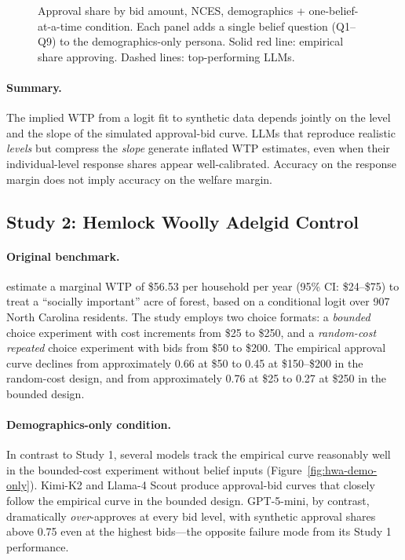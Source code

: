 \documentclass[12pt]{article}
\begin{document}
\begin{figure}[h]
    \centering
    \caption{Approval share by bid amount, NCES, demographics + one-belief-at-a-time condition. Each panel adds a single belief question (Q1--Q9) to the demographics-only persona. Solid red line: empirical share approving. Dashed lines: top-performing LLMs.}
    \label{fig:nces-one-belief}
\end{figure}

\paragraph{Summary.} The implied WTP from a logit fit to synthetic data depends jointly on the level and the slope of the simulated approval-bid curve. LLMs that reproduce realistic \emph{levels} but compress the \emph{slope} generate inflated WTP estimates, even when their individual-level response shares appear well-calibrated. Accuracy on the response margin does not imply accuracy on the welfare margin.

\subsection{Study 2: Hemlock Woolly Adelgid Control}\label{sec:results-hwa}

\paragraph{Original benchmark.} \textcite{Giguere2020} estimate a marginal WTP of \$56.53 per household per year (95\% CI: \$24--\$75) to treat a ``socially important'' acre of forest, based on a conditional logit over 907 North Carolina residents. The study employs two choice formats: a \emph{bounded} choice experiment with cost increments from \$25 to \$250, and a \emph{random-cost repeated} choice experiment with bids from \$50 to \$200. The empirical approval curve declines from approximately 0.66 at \$50 to 0.45 at \$150--\$200 in the random-cost design, and from approximately 0.76 at \$25 to 0.27 at \$250 in the bounded design.

\paragraph{Demographics-only condition.} In contrast to Study 1, several models track the empirical curve reasonably well in the bounded-cost experiment without belief inputs (Figure~\ref{fig:hwa-demo-only}). Kimi-K2 and Llama-4 Scout produce approval-bid curves that closely follow the empirical curve in the bounded design. GPT-5-mini, by contrast, dramatically \emph{over}-approves at every bid level, with synthetic approval shares above 0.75 even at the highest bids---the opposite failure mode from its Study 1 performance.
\end{document}
